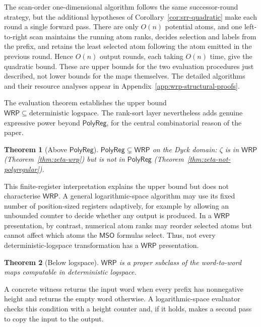 \documentclass[11pt]{article}
\newtheorem{theorem}{Theorem}[section]
\theoremstyle{definition}
\newcommand{\WRP}{\mathsf{WRP}}
\newcommand{\MSO}{\mathsf{MSO}}
\newcommand{\polyreg}{\mathsf{PolyReg}}
\begin{document}
The scan-order one-dimensional algorithm follows the same successor-round
strategy, but the additional hypotheses of Corollary~\ref{cor:srr-quadratic}
make each round a single forward pass.  There are only $O(n)$ potential atoms,
and one left-to-right scan maintains the running atom ranks, decides selection
and labels from the prefix, and retains the least selected atom following the
atom emitted in the previous round.  Hence $O(n)$ output rounds, each taking
$O(n)$ time, give the quadratic bound.  These are upper bounds for the two
evaluation procedures just described, not lower bounds for the maps
themselves.  The detailed algorithms and their resource analyses appear in
Appendix~\ref{app:wrp-structural-proofs}.

The evaluation theorem establishes the upper bound
$\WRP\subseteq\text{deterministic logspace}$.  The rank-sort layer nevertheless
adds genuine expressive power beyond $\polyreg$, for the central combinatorial
reason of the paper.

\begin{theorem}[Above $\polyreg$]\label{thm:wrp-strict-over-poly}
$\polyreg\subsetneq\WRP$ on the Dyck domain: $\zeta$ is
in $\WRP$ (Theorem~\ref{thm:zeta-wrp}) but is not in $\polyreg$
(Theorem~\ref{thm:zeta-not-polyregular}).
\end{theorem}

This finite-register interpretation explains the upper bound but does not
characterise $\WRP$.  A general logarithmic-space algorithm may use its fixed
number of position-sized registers adaptively, for example by allowing an
unbounded counter to decide whether any output is produced.  In a $\WRP$
presentation, by contrast, numerical atom ranks may reorder selected atoms but
cannot affect which atoms the $\MSO$ formulas select.  Thus, not every
deterministic-logspace transformation has a $\WRP$ presentation.

\begin{theorem}[Below logspace]
\label{thm:wrp-strict-below-logspace}
$\WRP$ is a proper subclass of the word-to-word maps computable in
deterministic logspace.
\end{theorem}

A concrete witness returns the input word when every prefix has nonnegative
height and returns the empty word otherwise.  A logarithmic-space evaluator
checks this condition with a height counter and, if it holds, makes a second
pass to copy the input to the output.
\end{document}
